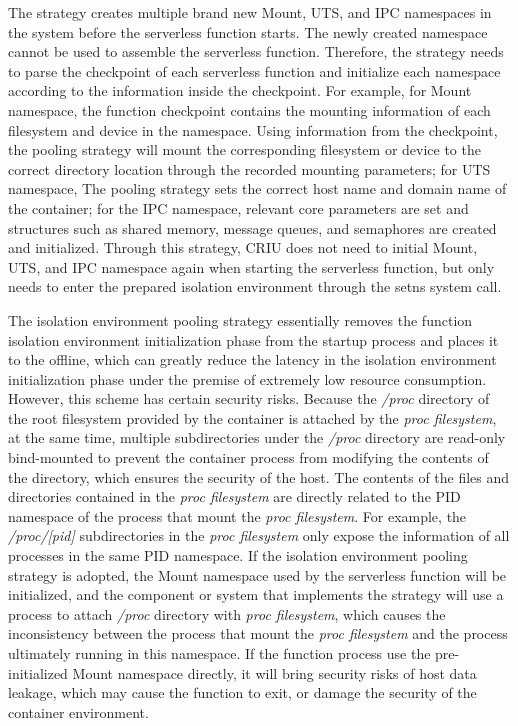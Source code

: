 The strategy creates multiple brand new Mount, UTS, and IPC namespaces in the system before the serverless function starts. 
The newly created namespace cannot be used to assemble the serverless function. Therefore, the strategy needs to parse the checkpoint of each serverless function and initialize each namespace according to the information inside the checkpoint. 
For example, for Mount namespace, 
the function checkpoint contains the mounting information of each filesystem and device in the namespace. 
Using information from the checkpoint, 
the pooling strategy will mount the corresponding filesystem or device to the correct directory location through the recorded mounting parameters; 
for UTS namespace, 
The pooling strategy sets the correct host name and domain name of the container; 
for the IPC namespace, 
relevant core parameters are set  
and structures such as shared memory, 
message queues, and semaphores are created and initialized. 
Through this strategy, 
CRIU does not need to initial Mount, UTS, and IPC namespace again when starting the serverless function, 
but only needs to enter the prepared isolation environment through the setns system call. 

The isolation environment pooling strategy 
essentially removes the function isolation environment 
initialization phase from the startup process and places it to the offline, 
which can greatly reduce the latency in the isolation environment 
initialization phase under the premise of extremely low resource consumption. However, 
this scheme has certain security risks. 
Because the \textit{/proc} directory of the root filesystem provided by the container is attached by the \textit{proc filesystem}, at the same time, 
multiple subdirectories under the \textit{/proc} directory are read-only bind-mounted to prevent the container process from modifying the contents of the directory, which ensures the security of the host. 
The contents of the files and directories contained in the \textit{proc filesystem} are directly related to the PID namespace of the process that mount the \textit{proc filesystem}. 
For example, 
the \textit{/proc/[pid]} subdirectories in the \textit{proc filesystem} only expose the information of all processes in the same PID namespace. 
If the isolation environment pooling strategy is adopted, 
the Mount namespace used by the serverless function will be initialized, 
and the component or system that implements the strategy will use a process to 
attach \textit{/proc} directory with \textit{proc filesystem}, 
which causes the inconsistency between the process that mount the \textit{proc filesystem} and the process ultimately running in this namespace. 
If the function process use the pre-initialized Mount namespace directly, 
it will bring security risks of host data leakage, 
which may cause the function to exit, 
or damage the security of the container environment.


